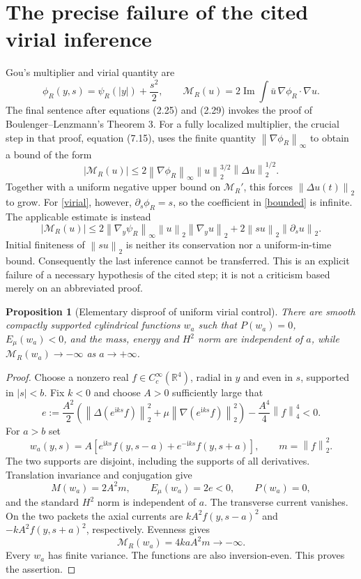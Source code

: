 \documentclass[11pt,a4paper]{article}
\newtheorem{proposition}{Proposition}
\newcommand{\R}{\mathbb R}
\newcommand{\ii}{\mathrm i}
\newcommand{\norm}[1]{\left\|#1\right\|}
\begin{document}
\section{The precise failure of the cited virial inference}
Gou's multiplier and virial quantity are
\begin{equation}\label{virial}
 \phi_R(y,s)=\psi_R(|y|)+\frac{s^2}{2},\qquad
 \mathcal M_R(u)=2\operatorname{Im}\int\bar u\,\nabla\phi_R\cdot\nabla u.
\end{equation}
The final sentence after equations (2.25) and (2.29) invokes the proof of Boulenger--Lenzmann's Theorem 3. For a fully localized multiplier, the crucial step in that proof, equation (7.15), uses the finite quantity $\norm{\nabla\phi_R}_\infty$ to obtain a bound of the form
\begin{equation}\label{bounded}
 |\mathcal M_R(u)|\le 2\norm{\nabla\phi_R}_\infty
 \norm u_2^{3/2}\norm{\Delta u}_2^{1/2}.
\end{equation}
Together with a uniform negative upper bound on $\mathcal M_R'$, this forces $\norm{\Delta u(t)}_2$ to grow. For \eqref{virial}, however, $\partial_s\phi_R=s$, so the coefficient in \eqref{bounded} is infinite. The applicable estimate is instead
\begin{equation}\label{correct}
 |\mathcal M_R(u)|\le
 2\norm{\nabla_y\psi_R}_\infty\norm u_2\norm{\nabla_yu}_2
 +2\norm{su}_2\norm{\partial_su}_2.
\end{equation}
Initial finiteness of $\norm{su}_2$ is neither its conservation nor a uniform-in-time bound. Consequently the last inference cannot be transferred. This is an explicit failure of a necessary hypothesis of the cited step; it is not a criticism based merely on an abbreviated proof.

\begin{proposition}[Elementary disproof of uniform virial control]\label{packets}
There are smooth compactly supported cylindrical functions $w_a$ such that $P(w_a)=0$, $E_\mu(w_a)<0$, and the mass, energy and $H^2$ norm are independent of $a$, while $\mathcal M_R(w_a)\to-\infty$ as $a\to+\infty$.
\end{proposition}
\begin{proof}
Choose a nonzero real $f\in C_c^\infty(\R^4)$, radial in $y$ and even in $s$, supported in $|s|<b$. Fix $k<0$ and choose $A>0$ sufficiently large that
\[
 e:=\frac{A^2}{2}\left(\norm{\Delta(e^{\ii ks}f)}_2^2+
 \mu\norm{\nabla(e^{\ii ks}f)}_2^2\right)-\frac{A^4}{4}\norm f_4^4<0.
\]
For $a>b$ set
\[
 w_a(y,s)=A\left[e^{\ii ks}f(y,s-a)+e^{-\ii ks}f(y,s+a)\right],
 \qquad m=\norm f_2^2.
\]
The two supports are disjoint, including the supports of all derivatives. Translation invariance and conjugation give
\[
 M(w_a)=2A^2m,\qquad E_\mu(w_a)=2e<0,\qquad P(w_a)=0,
\]
and the standard $H^2$ norm is independent of $a$. The transverse current vanishes. On the two packets the axial currents are $kA^2f(y,s-a)^2$ and $-kA^2f(y,s+a)^2$, respectively. Evenness gives
\begin{equation}\label{packetvirial}
 \mathcal M_R(w_a)=4kaA^2m\longrightarrow-\infty.
\end{equation}
Every $w_a$ has finite variance. The functions are also inversion-even. This proves the assertion.
\end{proof}
\end{document}
